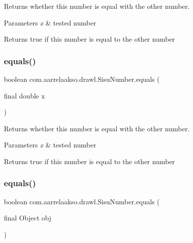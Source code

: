 Returns whether this number is equal with the other number. 


\begin{DoxyParams}{Parameters}
{\em x} & tested number \\
\hline
\end{DoxyParams}
\begin{DoxyReturn}{Returns}
true if this number is equal to the other number 
\end{DoxyReturn}
\mbox{\label{classcom_1_1aarrelaakso_1_1drawl_1_1_sisu_number_afb83c3ee221f4b839bae842d39ae9067}} 
\subsubsection{\texorpdfstring{equals()}{equals()}\hspace{0.1cm}{\footnotesize\ttfamily [2/3]}}
{\footnotesize\ttfamily boolean com.\+aarrelaakso.\+drawl.\+Sisu\+Number.\+equals (\begin{DoxyParamCaption}\item[{final double}]{x }\end{DoxyParamCaption})\hspace{0.3cm}{\ttfamily [protected]}}



Returns whether this number is equal with the other number. 


\begin{DoxyParams}{Parameters}
{\em x} & tested number \\
\hline
\end{DoxyParams}
\begin{DoxyReturn}{Returns}
true if this number is equal to the other number 
\end{DoxyReturn}
\mbox{\label{classcom_1_1aarrelaakso_1_1drawl_1_1_sisu_number_afb509c2c09d10318b136e4defbedd47e}} 
\subsubsection{\texorpdfstring{equals()}{equals()}\hspace{0.1cm}{\footnotesize\ttfamily [3/3]}}
{\footnotesize\ttfamily boolean com.\+aarrelaakso.\+drawl.\+Sisu\+Number.\+equals (\begin{DoxyParamCaption}\item[{final Object}]{obj }\end{DoxyParamCaption})}



